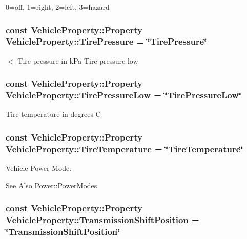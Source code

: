 0=off, 1=right, 2=left, 3=hazard \hypertarget{classVehicleProperty_a4709c7da616ca84dd4533562319d9bb8}{
\subsubsection[{Tire\-Pressure}]{\setlength{\rightskip}{0pt plus 5cm}const Vehicle\-Property\-::\-Property Vehicle\-Property\-::\-Tire\-Pressure = \char`\"{}Tire\-Pressure\char`\"{}\hspace{0.3cm}{\ttfamily [static]}}}\label{classVehicleProperty_a4709c7da616ca84dd4533562319d9bb8}
$<$ Tire pressure in k\-Pa Tire pressure low \hypertarget{classVehicleProperty_a39e0314efcb1040a285d8d71ff5cd701}{
\subsubsection[{Tire\-Pressure\-Low}]{\setlength{\rightskip}{0pt plus 5cm}const Vehicle\-Property\-::\-Property Vehicle\-Property\-::\-Tire\-Pressure\-Low = \char`\"{}Tire\-Pressure\-Low\char`\"{}\hspace{0.3cm}{\ttfamily [static]}}}\label{classVehicleProperty_a39e0314efcb1040a285d8d71ff5cd701}
Tire temperature in degrees C \hypertarget{classVehicleProperty_a6ec2a936e26226d1cb9fb84262e6adc2}{
\subsubsection[{Tire\-Temperature}]{\setlength{\rightskip}{0pt plus 5cm}const Vehicle\-Property\-::\-Property Vehicle\-Property\-::\-Tire\-Temperature = \char`\"{}Tire\-Temperature\char`\"{}\hspace{0.3cm}{\ttfamily [static]}}}\label{classVehicleProperty_a6ec2a936e26226d1cb9fb84262e6adc2}
Vehicle Power Mode. \begin{DoxySeeAlso}{See Also}
Power\-::\-Power\-Modes 
\end{DoxySeeAlso}
\hypertarget{classVehicleProperty_ae486d9ea26918460822086b797018800}{
\subsubsection[{Transmission\-Shift\-Position}]{\setlength{\rightskip}{0pt plus 5cm}const Vehicle\-Property\-::\-Property Vehicle\-Property\-::\-Transmission\-Shift\-Position = \char`\"{}Transmission\-Shift\-Position\char`\"{}\hspace{0.3cm}{\ttfamily [static]}}}\label{classVehicleProperty_ae486d9ea26918460822086b797018800}
